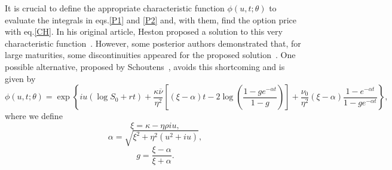 It is crucial to define the appropriate characteristic function $\phi(u,t;\theta)$ to evaluate the integrals in eqs.\eqref{P1} and \eqref{P2} and, with them, find the option price with eq.\eqref{CH}. In his original article, Heston proposed a solution to this very characteristic function~\citep{Heston}. However, some posterior authors demonstrated that, for large maturities, some discontinuities appeared for the proposed solution~\citep{Kahl}. One possible alternative, proposed by Schoutens~\citep{Schoutens}, avoids this shortcoming and is given by
\begin{equation}\label{charfuncschoutens}
\phi(u,t;\theta)=\exp\left\{iu\left(\log S_0+rt\right)+\frac{\kappa\overline{\nu}}{\eta^2}\left[\left(\xi-\alpha\right)t-2\log\left(\frac{1-ge^{-\alpha t}}{1-g}\right)\right]+\frac{\nu_0}{\eta^2}\left(\xi-\alpha\right)\frac{1-e^{-\alpha t}}{1-ge^{-\alpha t}}\right\},
\end{equation}
\noindent where we define
\begin{equation}\label{xi}
\xi=\kappa-\eta\rho iu,
\end{equation}
\begin{equation}\label{alpha}
\alpha=\sqrt{\xi^2+\eta^2(u^2+iu)},
\end{equation}
\begin{equation}
g=\frac{\xi-\alpha}{\xi+\alpha}.
\end{equation}


